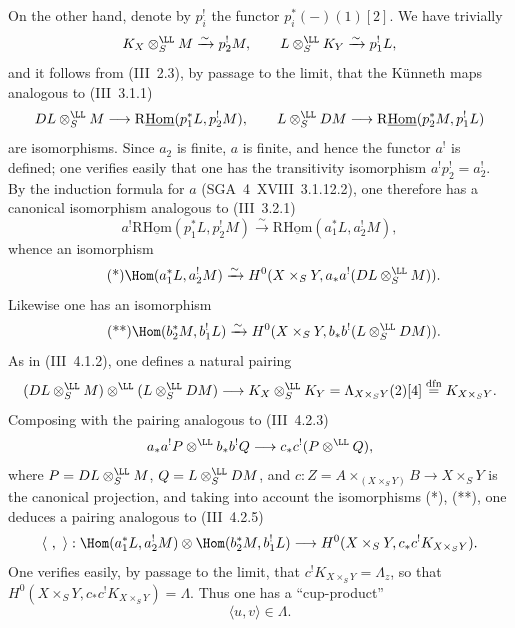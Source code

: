 On the other hand, denote by $p_i^!$ the functor $p_i^*(-)(1)[2]$. We have trivially
\[
K_X\otimes_S^{\LL}M\xrightarrow{\sim}p_2^!M,
\qquad
L\otimes_S^{\LL}K_Y\xrightarrow{\sim}p_1^!L,
\]
and it follows from (III~2.3), by passage to the limit, that the Künneth maps analogous to (III~3.1.1)
\[
DL\otimes_S^{\LL}M\longrightarrow \mathrm{R}\underline{\mathrm{Hom}}(p_1^*L,p_2^!M),
\qquad
L\otimes_S^{\LL}DM\longrightarrow \mathrm{R}\underline{\mathrm{Hom}}(p_2^*M,p_1^!L)
\]
are isomorphisms. Since $a_2$ is finite, $a$ is finite, and hence the functor $a^!$ is defined; one verifies easily that one has the transitivity isomorphism $a^!p_2^!=a_2^!$. By the induction formula for $a$ (SGA~4~XVIII~3.1.12.2), one therefore has a canonical isomorphism analogous to (III~3.2.1)
\[
a^!\mathrm{R}\underline{\mathrm{Hom}}(p_1^*L,p_2^!M)\xrightarrow{\sim}\mathrm{R}\underline{\mathrm{Hom}}(a_1^*L,a_2^!M),
\]
whence an isomorphism
\begin{equation}\tag{*}
\Hom(a_1^*L,a_2^!M)\xrightarrow{\sim}H^0(X\times_S Y,a_*a^!(DL\otimes_S^{\LL}M)).
\end{equation}
Likewise one has an isomorphism
\begin{equation}\tag{**}
\Hom(b_2^*M,b_1^!L)\xrightarrow{\sim}H^0(X\times_S Y,b_*b^!(L\otimes_S^{\LL}DM)).
\end{equation}
As in (III~4.1.2), one defines a natural pairing
\[
(DL\otimes_S^{\LL}M)\otimes^{\LL}(L\otimes_S^{\LL}DM)
\longrightarrow K_X\otimes_S^{\LL}K_Y=\Lambda_{X\times_S Y}(2)[4]\stackrel{\mathrm{dfn}}{=}K_{X\times_S Y}.
\]
Composing with the pairing analogous to (III~4.2.3)
\[
a_*a^!P\otimes^{\LL} b_*b^!Q\longrightarrow c_*c^!(P\otimes^{\LL}Q),
\]
where $P=DL\otimes_S^{\LL}M$, $Q=L\otimes_S^{\LL}DM$, and $c:Z=A\times_{(X\times_S Y)}B\to X\times_S Y$ is the canonical projection, and taking into account the isomorphisms (*), (**), one deduces a pairing analogous to (III~4.2.5)
\[
\langle\ ,\ \rangle:\Hom(a_1^*L,a_2^!M)\otimes\Hom(b_2^*M,b_1^!L)
\longrightarrow H^0(X\times_S Y,c_*c^!K_{X\times_S Y}).
\]
One verifies easily, by passage to the limit, that $c^!K_{X\times_S Y}=\Lambda_z$, so that $H^0(X\times_S Y,c_*c^!K_{X\times_S Y})=\Lambda$. Thus one has a ``cup-product''
\begin{equation}\tag{1.1.2}
\langle u,v\rangle\in\Lambda.
\end{equation}

